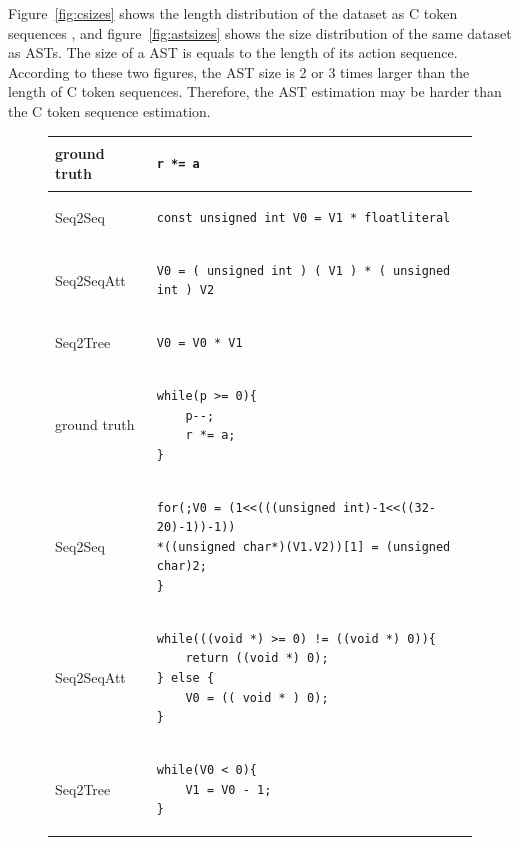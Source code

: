 \documentclass[senior,final,11pt]{iscs-thesis}
\begin{document}
Figure~\ref{fig:csizes} shows the length distribution of the dataset as C token sequences
, and figure~\ref{fig:astsizes} shows the size distribution of the same dataset as ASTs.
The size of a AST is equals to the length of its action sequence.
According to these two figures, the AST size is 2 or 3 times larger than the length of C token sequences.
Therefore, the AST estimation may be harder than the C token sequence estimation.

\begin{figure}
	\begin{tabular}{|l|l|} \hline
	 ground truth & 
		\begin{lstlisting}[style=Csample]
r *= a
		\end{lstlisting} \\ \hline
		Seq2Seq & 
		\begin{lstlisting}[style=Csample]
const unsigned int V0 = V1 * floatliteral
		\end{lstlisting} \\ \hline
		Seq2SeqAtt & 
		\begin{lstlisting}[style=Csample]
V0 = ( unsigned int ) ( V1 ) * ( unsigned int ) V2
		\end{lstlisting} \\ \hline
		Seq2Tree & 
		\begin{lstlisting}[style=Csample]
V0 = V0 * V1
		\end{lstlisting} \\ \hline
		\hline	
	 ground truth & 
		\begin{lstlisting}[style=Csample]
while(p >= 0){
	p--;
	r *= a;
}
		\end{lstlisting} \\ \hline
		Seq2Seq & 
		\begin{lstlisting}[style=Csample]
for(;V0 = (1<<(((unsigned int)-1<<((32-20)-1))-1))
*((unsigned char*)(V1.V2))[1] = (unsigned char)2;
}
		\end{lstlisting} \\ \hline
		Seq2SeqAtt & 
		\begin{lstlisting}[style=Csample]
while(((void *) >= 0) != ((void *) 0)){ 
	return ((void *) 0);
} else { 
	V0 = (( void * ) 0); 
}
		\end{lstlisting} \\ \hline
		Seq2Tree & 
		\begin{lstlisting}[style=Csample]
while(V0 < 0){ 
	V1 = V0 - 1;
}
		\end{lstlisting}
		 \\ \hline	\hline

\end{tabular}
\end{figure}
\end{document}
